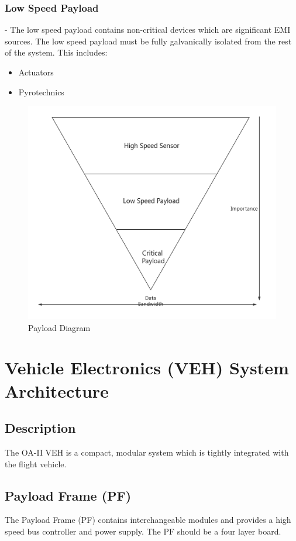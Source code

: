 \documentclass[12pt,article]{memoir}
\begin{document}
\subsection{Low Speed Payload} - The low speed payload contains non-critical devices which are significant EMI sources. The low speed payload must be fully galvanically isolated from the rest of the system. This includes:
\begin{itemize}
\item Actuators
\item Pyrotechnics
\end{itemize}
\begin{figure}[htp]
\includegraphics[width=\textwidth]{img/ES00002_payloadCata.png}
 \caption{Payload Diagram}	
\end{figure}
\clearpage

\chapter{Vehicle Electronics (VEH) System Architecture}
\section{Description}
The OA-II VEH is a compact, modular system which is tightly integrated with the flight vehicle.
\section{Payload Frame (PF)}
The Payload Frame (PF) contains interchangeable modules and provides a high speed bus controller and power supply. The PF should be a four layer board.
\end{document}
